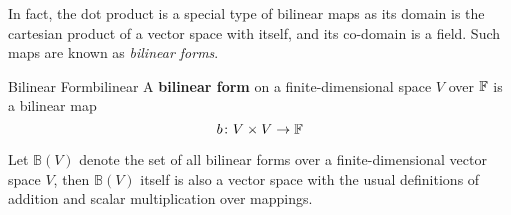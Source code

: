 \documentclass[math, code]{amznotes}
\theoremstyle{remark}
\begin{document}
In fact, the dot product is a special type of bilinear maps as its domain is the cartesian product of a vector space with itself, and its co-domain is a field. Such maps are known as \textit{bilinear forms}.
\begin{dfnbox}{Bilinear Form}{bilinear}
    A {\color{red} \textbf{bilinear form}} on a finite-dimensional space $V$ over $\mathbb{F}$ is a bilinear map 
    \begin{equation*}
        b \colon V \times V \to \mathbb{F}
    \end{equation*}   
\end{dfnbox}
Let $\mathbb{B}(V)$ denote the set of all bilinear forms over a finite-dimensional vector space $V$, then $\mathbb{B}(V)$ itself is also a vector space with the usual definitions of addition and scalar multiplication over mappings. 
\end{document}
